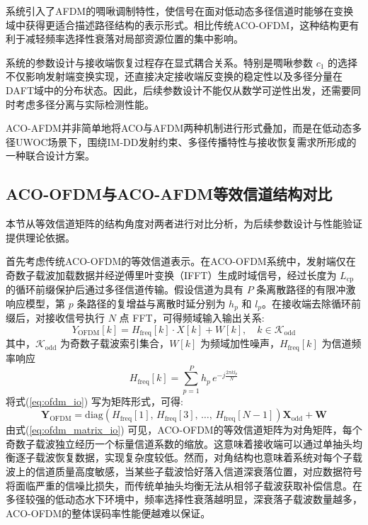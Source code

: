 系统引入了AFDM的啁啾调制特性，使信号在面对低动态多径信道时能够在变换域中获得更适合描述路径结构的表示形式。相比传统ACO-OFDM，这种结构更有利于减轻频率选择性衰落对局部资源位置的集中影响。

系统的参数设计与接收端恢复过程存在显式耦合关系。特别是啁啾参数 $c_1$ 的选择不仅影响发射端变换实现，还直接决定接收端反变换的稳定性以及多径分量在DAFT域中的分布状态。因此，后续参数设计不能仅从数学可逆性出发，还需要同时考虑多径分离与实际检测性能。

ACO-AFDM并非简单地将ACO与AFDM两种机制进行形式叠加，而是在低动态多径UWOC场景下，围绕IM-DD发射约束、多径传播特性与接收恢复需求所形成的一种联合设计方案。

\subsection{ACO-OFDM与ACO-AFDM等效信道结构对比}
\label{subsec:channel_structure_comparison}

本节从等效信道矩阵的结构角度对两者进行对比分析，为后续参数设计与性能验证提供理论依据。

首先考虑传统ACO-OFDM的等效信道表示。在ACO-OFDM系统中，发射端仅在奇数子载波加载数据并经逆傅里叶变换（IFFT）生成时域信号，经过长度为 $L_{\mathrm{cp}}$ 的循环前缀保护后通过多径信道传输。假设信道为具有 $P$ 条离散路径的有限冲激响应模型，第 $p$ 条路径的复增益与离散时延分别为 $h_p$ 和 $l_p$。在接收端去除循环前缀后，对接收信号执行 $N$ 点 FFT，可得频域输入输出关系:
\begin{equation}
    Y_{\mathrm{OFDM}}[k] = H_{\mathrm{freq}}[k] \cdot X[k] + W[k], \quad k \in \mathcal{K}_{\mathrm{odd}}
    \label{eq:ofdm_io}
\end{equation}
其中，$\mathcal{K}_{\mathrm{odd}}$ 为奇数子载波索引集合，$W[k]$ 为频域加性噪声，$H_{\mathrm{freq}}[k]$ 为信道频率响应
\begin{equation}
    H_{\mathrm{freq}}[k] = \sum_{p=1}^{P} h_p \, e^{-j\frac{2\pi k l_p}{N}}
    \label{eq:ofdm_channel_freq}
\end{equation}
将式(\ref{eq:ofdm_io}) 写为矩阵形式，可得:
\begin{equation}
    \mathbf{Y}_{\mathrm{OFDM}} = \mathrm{diag}\!\left(H_{\mathrm{freq}}[1],\, H_{\mathrm{freq}}[3],\, \ldots,\, H_{\mathrm{freq}}[N-1]\right) \mathbf{X}_{\mathrm{odd}} + \mathbf{W}
    \label{eq:ofdm_matrix_io}
\end{equation}
由式(\ref{eq:ofdm_matrix_io}) 可见，ACO-OFDM的等效信道矩阵为对角矩阵，每个奇数子载波独立经历一个标量信道系数的缩放。这意味着接收端可以通过单抽头均衡逐子载波恢复数据，实现复杂度较低。然而，对角结构也意味着系统对每个子载波上的信道质量高度敏感，当某些子载波恰好落入信道深衰落位置，对应数据符号将面临严重的信噪比损失，而传统单抽头均衡无法从相邻子载波获取补偿信息。在多径较强的低动态水下环境中，频率选择性衰落越明显，深衰落子载波数量越多，ACO-OFDM的整体误码率性能便越难以保证。

